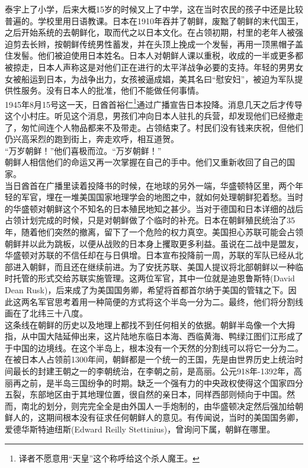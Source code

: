 泰宇上了小学，后来大概15岁的时候又上了中学，这在当时农民的孩子中还是比较普遍的。学校里用日语教课。日本在1910年吞并了朝鲜，废黜了朝鲜的末代国王，之后开始系统的去朝鲜化，取而代之以日本文化。在占领初期，村里的老年人被强迫剪去长辫，按朝鲜传统男性蓄发，并在头顶上挽成一个发髻，再用一顶黑帽子盖住发髻。他们被迫使用日本姓名。日本人对朝鲜人课以重税，收成的一半或更多都被掠走，日本人声称这是对他们正在进行的太平洋战争必要的支持。年轻的男男女女被船运到日本，为战争出力，女孩被逼成娼，美其名曰“慰安妇”，被迫为军队提供性服务。没有日本人的批准，他们不能做任何事情。\\

1945年8月15号这一天，日酋首裕仁\footnote{译者不愿意用“天皇”这个称呼给这个杀人魔王。}通过广播宣告日本投降。消息几天之后才传导这个小村庄。听见这个消息，男孩们冲向日本人驻扎的兵营，却发现他们已经撤走了，匆忙间连个人物品都来不及带走。占领结束了。村民们没有钱来庆祝，但他们仍兴高采烈的跑到街上，奔走欢呼，相互道贺。\\

“万岁朝鲜！”他们喜极而泣。“万岁朝鲜！”\\

朝鲜人相信他们的命运又再一次掌握在自己的手中。他们又重新收回了自己的国家。\\

当日酋首在广播里读着投降书的时候，在地球的另外一端，华盛顿特区里，两个年轻的军官，埋在一堆美国国家地理学会的地图之中，就如何处理朝鲜犯着愁。当时的华盛顿对朝鲜这个不知名的日本殖民地知之甚少。当对于德国和日本详细的战后占领计划完成的时候，只是对朝鲜做了个临时的补充。日本在朝鲜殖民统治了35年，随着他们突然的撤离，留下了一个危险的权力真空。美国担心苏联可能会占领朝鲜并以此为跳板，以便从战败的日本身上攫取更多利益。虽说在二战中是盟友，华盛顿对苏联的不信任却在与日俱增。日本宣布投降前一周，苏联的军队已经从北部进入朝鲜，而且还在继续前进。为了安抚苏联、美国人提议将北部朝鲜以一种临时托管的形式交给苏联实施管理。这两位军官，其中一位就是迪恩鲁斯特(David Dean Rusk)，后来成了为美国国务卿，希望将首都首尔纳于美国的管辖之下。因此这两名军官思考着用一种简便的方式将这个半岛一分为二。最终，他们将分割线画在了北纬三十八度。\\

这条线在朝鲜的历史以及地理上都找不到任何相关的依据。朝鲜半岛像一个大拇指，从中国大陆延伸出来，这片陆地东临日本海、西临黄海、鸭绿江图们江形成了于中国的边境线。在这个半岛上，根本没有一个天然的分割线可以将它一分为二。在被日本人占领前1300年间，朝鲜都是一个统一的王国，先是由世界历史上统治时间最长的封建王朝之一的李朝统治，在李朝之前，是高丽。公元918年-1392年，高丽再之前，是半岛三国纷争的时期。缺乏一个强有力的中央政权使得这个国家四分五裂，东部地区由于其地理位置，很自然的亲日本，同样西部则倾向于中国。然而，南北的划分，则完完全全是由外国人一手炮制的，由华盛顿决定然后强加给朝鲜人的，这期间根本没有征求任何朝鲜人的意见。有传闻说，当时的美国国务卿，爱德华斯特迪纽斯(Edward Reilly Stettinius)，曾询问下属，朝鲜在哪里。\\

